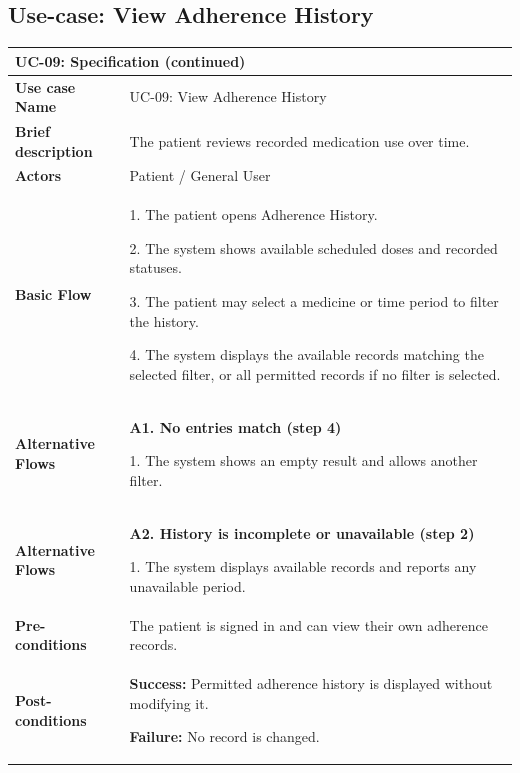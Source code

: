 \subsection{Use-case: View Adherence History}
\label{uc:uc-09}
\begin{longtable}{|p{}|p{}|}
\hline
\endfirsthead
\multicolumn{2}{l}{\textbf{UC-09: Specification (continued)}} \\
\hline
\endhead
\textbf{Use case Name} & UC-09: View Adherence History \\ \hline
\textbf{Brief description} & The patient reviews recorded medication use over time. \\ \hline
\textbf{Actors} & Patient / General User \\ \hline
\textbf{Basic Flow} &
1. The patient opens Adherence History.\par
2. The system shows available scheduled doses and recorded statuses.\par
3. The patient may select a medicine
or time period to filter the history.\par
4. The system displays the available
records matching the selected filter,
or all permitted records if no
filter is selected.
\\ \hline
\textbf{Alternative Flows} &
\textbf{A1. No entries match (step 4)}\par
1. The system shows an empty result and allows another filter.
\\ \hline
\textbf{Alternative Flows} &
\textbf{A2. History is incomplete or unavailable (step 2)}\par
1. The system displays available records and reports any unavailable period.
\\ \hline
\textbf{Pre-conditions} & The patient is signed in and can view their own adherence records. \\ \hline
\textbf{Post-conditions} & \textbf{Success:} Permitted adherence history is displayed without modifying it.\par
\textbf{Failure:} No record is changed. \\ \hline
\end{longtable}
\clearpage

